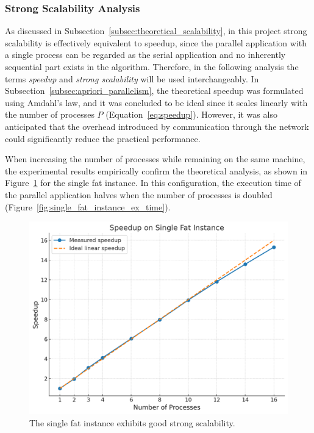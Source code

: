 \documentclass{article}
\begin{document}
\subsubsection{Strong Scalability Analysis}
As discussed in Subsection~\ref{subsec:theoretical_scalability}, in this project strong scalability is effectively equivalent to speedup, since the parallel application with a single process can be regarded as the serial application and no inherently sequential part exists in the algorithm.  
Therefore, in the following analysis the terms \emph{speedup} and \emph{strong scalability} will be used interchangeably.
In Subsection~\ref{subsec:apriori_parallelism}, the theoretical speedup was formulated using Amdahl's law, and it was concluded to be ideal since it scales linearly with the number of processes $P$ (Equation~\eqref{eq:speedup}).  
However, it was also anticipated that the overhead introduced by communication through the network could significantly reduce the practical performance.

When increasing the number of processes while remaining on the same machine, the experimental results empirically confirm the theoretical analysis, as shown in Figure~\ref{fig:strong_scaling_single_fat_instance} for the single fat instance.  
In this configuration, the execution time of the parallel application halves when the number of processes is doubled (Figure~\ref{fig:single_fat_instance_ex_time}).

\begin{figure}[H]
    \centering
    \includegraphics[width=0.8\linewidth]{parallel_strong_scaling_16_cores.png}
    \caption{The single fat instance exhibits good strong scalability.}
    \label{fig:strong_scaling_single_fat_instance}
\end{figure}
\end{document}
